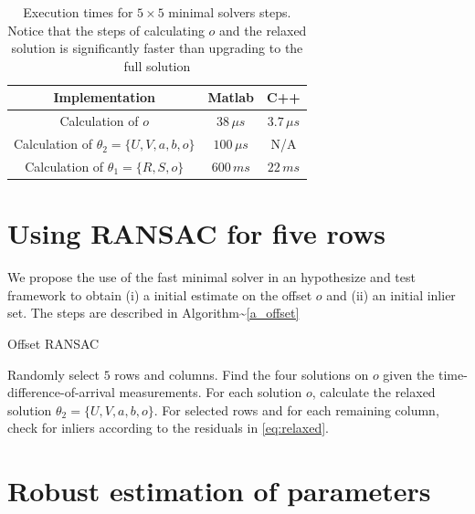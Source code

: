 \documentclass[
]{book}
\begin{document}
\begin{table}
\caption{Execution times for $5 \times 5$ minimal solvers steps. Notice that the steps of calculating $o$ and the relaxed solution is significantly faster than upgrading to the full solution}
\centering
\vspace{4mm}
\begin{tabular}{@{}ccc@{}} \toprule
Implementation & Matlab  & C++ \\
\midrule 
Calculation of $o$ & $38 \, \mu s$ & $3.7 \, \mu s$ \\
Calculation of $\theta_2 = \{ U,V,a,b,o \}$ & $100 \, \mu s$ & N/A \\
Calculation of $\theta_1 = \{ R,S,o \}$ & $600 \, ms$ & $22 \, ms$ \\
\bottomrule
\end{tabular}
\label{Tabletime}
\end{table}

\vspace{-5pt}

\section{Using RANSAC for five rows}
\label{sec:ransac}
\vspace{-5pt}

We propose the use of the fast minimal solver in an hypothesize and test framework to obtain (i) a initial estimate on the offset \(o\) and (ii) an initial inlier set. The steps are described in Algorithm\textasciitilde{}\ref{a_offset}

\begin{algorithm}
\caption{Offset RANSAC}\label{a_offset}
\begin{algorithmic}[1]
\State Randomly select $5$ rows and columns. Find the four solutions on $o$ given the time-difference-of-arrival measurements. 
\State For each solution $o$, calculate the relaxed solution $\theta_2 = \{ U,V,a,b,o \}$.
\State For selected rows and for each remaining column, check for inliers according to the residuals in \eqref{eq:relaxed}.
\end{algorithmic}
\end{algorithm}

\vspace{-5pt}
\section{Robust estimation of parameters}
\label{sec:ransac}
\vspace{-5pt}
\end{document}

